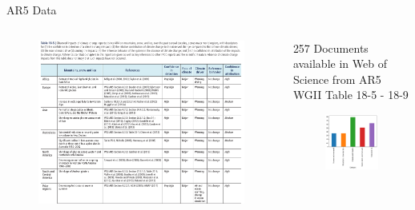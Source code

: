 \documentclass[9pt]{beamer}
\begin{document}
\begin{frame}{AR5 Data}

	\begin{columns}
		\begin{column}{0.618\linewidth}
			\begin{figure}
				\includegraphics[width=\linewidth]{images/table.png}
			\end{figure}
		\end{column}
		\begin{column}{0.382\linewidth}
			257 Documents available in Web of Science from AR5 WGII Table 18-5 - 18-9
			
			\begin{figure}
				\includegraphics[width=\linewidth]{../plots/category_distribution.png}
			\end{figure}
		\end{column}
	\end{columns}



\end{frame}
\end{document}
